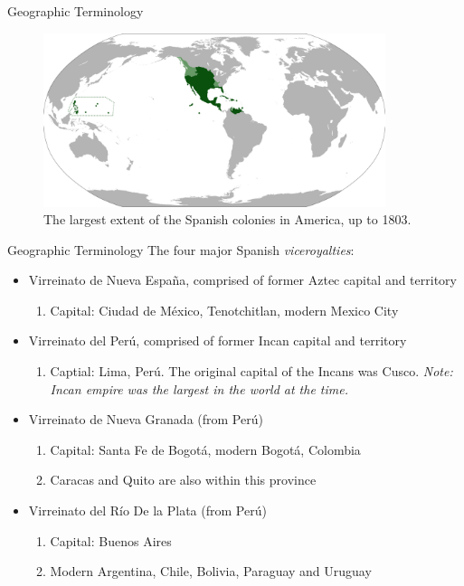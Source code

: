 \documentclass{beamer}
\begin{document}
\begin{frame}{Geographic Terminology}
\begin{figure}
\centering
\includegraphics[width=10cm]{figures/vice.png}
\caption{The largest extent of the Spanish colonies in America, up to 1803.}
\end{figure}
\end{frame}

\begin{frame}{Geographic Terminology}
\small
The four major Spanish \textit{viceroyalties}:
\begin{itemize}
\item Virreinato de Nueva Espa\~{n}a, comprised of former Aztec capital and territory
\begin{enumerate}
\item Capital: Ciudad de M\'{e}xico, Tenotchitlan, modern Mexico City
\end{enumerate}
\item Virreinato del Per\'{u}, comprised of former Incan capital and territory
\begin{enumerate}
\item Captial: Lima, Per\'{u}.  The original capital of the Incans was Cusco.  \textit{Note: Incan empire was the largest in the world at the time.}
\end{enumerate}
\item Virreinato de Nueva Granada (from Per\'{u})
\begin{enumerate}
\item Capital: Santa Fe de Bogot\'{a}, modern Bogot\'{a}, Colombia
\item Caracas and Quito are also within this province
\end{enumerate}
\item Virreinato del R\'{i}o De la Plata (from Per\'{u})
\begin{enumerate}
\item Capital: Buenos Aires
\item Modern Argentina, Chile, Bolivia, Paraguay and Uruguay
\end{enumerate}
\end{itemize}
\end{frame}
\end{document}
